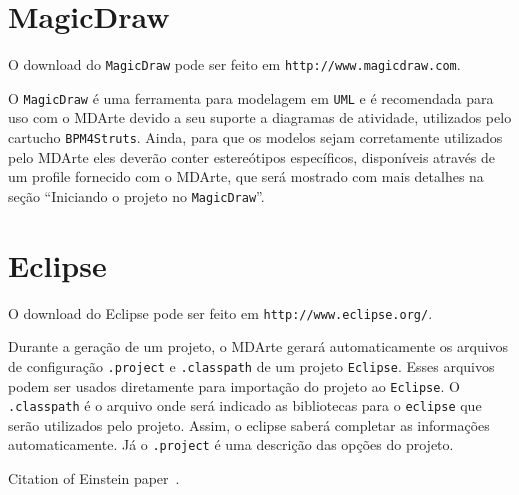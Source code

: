 \section{MagicDraw}

O download do \texttt{MagicDraw} pode ser feito em
\texttt{http://www.magicdraw.com}.

O \texttt{MagicDraw} é uma ferramenta para modelagem em \texttt{UML} e é
recomendada para uso com o MDArte devido a seu suporte a diagramas de atividade,
utilizados pelo cartucho \texttt{BPM4Struts}. Ainda, para que os modelos sejam
corretamente utilizados pelo MDArte eles deverão conter estereótipos
específicos, disponíveis através de um profile fornecido com o MDArte, que será
mostrado com mais detalhes na seção “Iniciando o projeto no \texttt{MagicDraw}”.

\section{Eclipse}

O download do Eclipse pode ser feito em \texttt{http://www.eclipse.org/}. 

Durante a geração de um projeto, o MDArte gerará automaticamente os arquivos de
configuração \texttt{.project} e \texttt{.classpath} de um projeto
\texttt{Eclipse}. Esses arquivos podem ser usados diretamente para importação do
projeto ao \texttt{Eclipse}. O \texttt{.classpath} é o arquivo onde será
indicado as bibliotecas para o \texttt{eclipse} que serão utilizados pelo
projeto. Assim, o eclipse saberá completar as informações automaticamente. Já o
\texttt{.project} é uma descrição das opções do projeto.

Citation of Einstein paper~\cite{Einstein}.